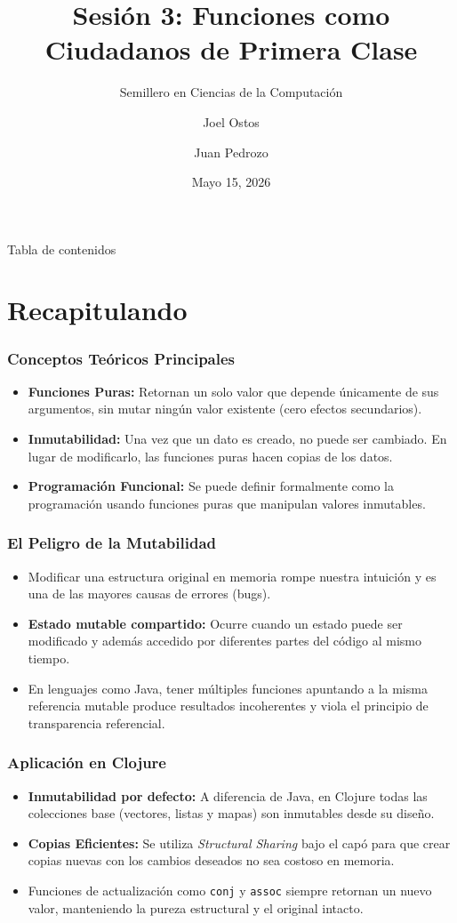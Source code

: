 \documentclass{beamer}
\title{Sesión 3: Funciones como Ciudadanos de Primera Clase }
\subtitle{  Semillero en Ciencias de la Computación }
\author[Ostos, Pedrozo ]{Joel Ostos \and Juan Pedrozo}
\date{ Mayo 15, 2026 }
\begin{document}
\frame{\titlepage}

\begin{frame}{ Tabla de contenidos }
    \tableofcontents    
\end{frame}

\section{Recapitulando}

\begin{frame}
\frametitle{Conceptos Teóricos Principales}
\begin{itemize}
    \item \textbf{Funciones Puras:} Retornan un solo valor que depende únicamente de sus argumentos, sin mutar ningún valor existente (cero efectos secundarios).
    \item \textbf{Inmutabilidad:} Una vez que un dato es creado, no puede ser cambiado. En lugar de modificarlo, las funciones puras hacen copias de los datos.
    \item \textbf{Programación Funcional:} Se puede definir formalmente como la programación usando funciones puras que manipulan valores inmutables.
\end{itemize}
\end{frame}

\begin{frame}
\frametitle{El Peligro de la Mutabilidad}
\begin{itemize}
    \item Modificar una estructura original en memoria rompe nuestra intuición y es una de las mayores causas de errores (bugs).
    \item \textbf{Estado mutable compartido:} Ocurre cuando un estado puede ser modificado y además accedido por diferentes partes del código al mismo tiempo.
    \item En lenguajes como Java, tener múltiples funciones apuntando a la misma referencia mutable produce resultados incoherentes y viola el principio de transparencia referencial.
\end{itemize}
\end{frame}

\begin{frame}
\frametitle{Aplicación en Clojure}
\begin{itemize}
    \item \textbf{Inmutabilidad por defecto:} A diferencia de Java, en Clojure todas las colecciones base (vectores, listas y mapas) son inmutables desde su diseño.
    \item \textbf{Copias Eficientes:} Se utiliza \textit{Structural Sharing} bajo el capó para que crear copias nuevas con los cambios deseados no sea costoso en memoria.
    \item Funciones de actualización como \texttt{conj} y \texttt{assoc} siempre retornan un nuevo valor, manteniendo la pureza estructural y el original intacto.
\end{itemize}
\end{frame}
\end{document}

